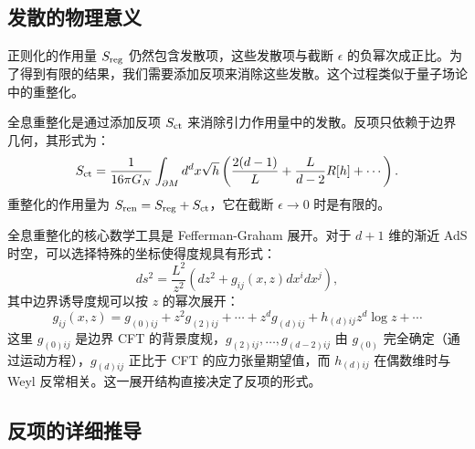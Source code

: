 \subsection{发散的物理意义}

正则化的作用量 $S_{\rm reg}$ 仍然包含发散项，这些发散项与截断 $\epsilon$ 的负幂次成正比。为了得到有限的结果，我们需要添加反项来消除这些发散。这个过程类似于量子场论中的重整化。

\begin{definition}[全息重整化]
全息重整化是通过添加反项 $S_{\rm ct}$ 来消除引力作用量中的发散。反项只依赖于边界几何，其形式为：
\begin{equation}
    S_{\rm ct} = \frac{1}{16\pi G_N} \int_{\partial M} d^d x \sqrt{h} \left( \frac{2(d-1)}{L} + \frac{L}{d-2} R[h] + \cdots \right).
\end{equation}
重整化的作用量为 $S_{\rm ren} = S_{\rm reg} + S_{\rm ct}$，它在截断 $\epsilon \to 0$ 时是有限的。
\end{definition}

\begin{remark}
全息重整化的核心数学工具是 Fefferman-Graham 展开\cite{deHaro2000}。对于 $d+1$ 维的渐近 AdS 时空，可以选择特殊的坐标使得度规具有形式：
\begin{equation}
    ds^2 = \frac{L^2}{z^2} \left( dz^2 + g_{ij}(x,z) dx^i dx^j \right),
\end{equation}
其中边界诱导度规可以按 $z$ 的幂次展开：
\begin{equation}
    g_{ij}(x,z) = g_{(0)ij} + z^2 g_{(2)ij} + \cdots + z^d g_{(d)ij} + h_{(d)ij} z^d \log z + \cdots
\end{equation}
这里 $g_{(0)ij}$ 是边界 CFT 的背景度规，$g_{(2)ij}, \ldots, g_{(d-2)ij}$ 由 $g_{(0)}$ 完全确定（通过运动方程），$g_{(d)ij}$ 正比于 CFT 的应力张量期望值，而 $h_{(d)ij}$ 在偶数维时与 Weyl 反常相关\cite{Henningson1998}。这一展开结构直接决定了反项的形式。
\end{remark}

\subsection{反项的详细推导}

